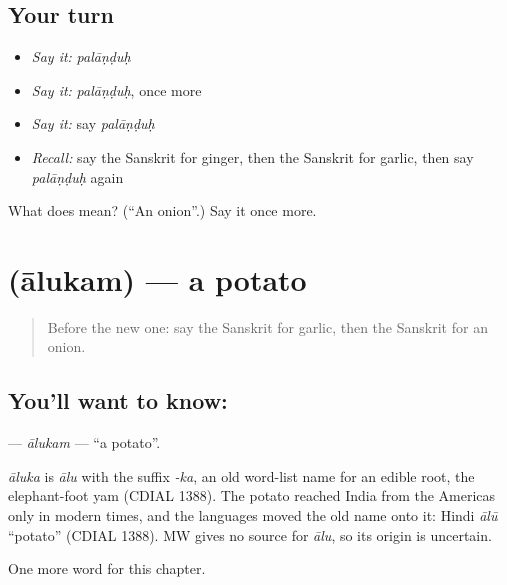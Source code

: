 \subsection*{Your turn}
\begin{itemize}
\raggedright
  \item \emph{Say it:} \emph{palāṇḍuḥ}
  \item \emph{Say it:} \emph{palāṇḍuḥ}, once more
  \item \emph{Say it:} say \emph{palāṇḍuḥ}
  \item \emph{Recall:} say the Sanskrit for ginger, then the Sanskrit for garlic, then say \emph{palāṇḍuḥ} again
\end{itemize}

\begin{tcolorbox}[breakable,colback=teal!4,colframe=teal!35!black,title={Before you move on}]
What does  mean? (\textquotedblleft{}An onion\textquotedblright{}.) Say it once more.
\end{tcolorbox}
\section[\texorpdfstring{\sk{आलुकम्} (ālukam)}{आलुकम् (ālukam)}]{ (ālukam) — a potato}

\label{lesson:SA-C108-alukam}



\begin{quote}
Before the new one: say the Sanskrit for garlic, then the Sanskrit for an onion.
\end{quote}

\subsection*{You'll want to know: }
\textbf{} — \emph{ālukam} — \textquotedblleft{}a potato\textquotedblright{}.

\begin{cousinweb}
\emph{āluka} is \emph{ālu} with the suffix \emph{-ka}, an old word-list name for an edible root, the elephant-foot yam (CDIAL 1388). The potato reached India from the Americas only in modern times, and the languages moved the old name onto it: Hindi \emph{ālū} \textquotedblleft{}potato\textquotedblright{} (CDIAL 1388). MW gives no source for \emph{ālu}, so its origin is uncertain.
\end{cousinweb}

\begin{grammarlens}[title={What you've built}]
One more word for this chapter.
\end{grammarlens}

